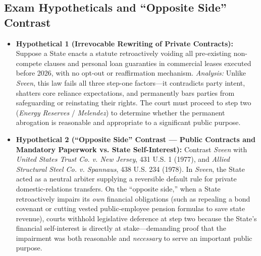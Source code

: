 \documentclass[12pt]{article}
\begin{document}
\subsection{Exam Hypotheticals and ``Opposite Side'' Contrast}
\begin{itemize}
  \item \textbf{Hypothetical 1 (Irrevocable Rewriting of Private Contracts):} Suppose a State enacts a statute retroactively voiding all pre-existing non-compete clauses and personal loan guaranties in commercial leases executed before 2026, with no opt-out or reaffirmation mechanism. \textit{Analysis:} Unlike \textit{Sveen}, this law fails all three step-one factors---it contradicts party intent, shatters core reliance expectations, and permanently bars parties from safeguarding or reinstating their rights. The court must proceed to step two (\textit{Energy Reserves} / \textit{Melendez}) to determine whether the permanent abrogation is reasonable and appropriate to a significant public purpose.
  \item \textbf{Hypothetical 2 (``Opposite Side'' Contrast --- Public Contracts and Mandatory Paperwork vs. State Self-Interest):} Contrast \textit{Sveen} with \textit{United States Trust Co. v. New Jersey}, 431 U.S. 1 (1977), and \textit{Allied Structural Steel Co. v. Spannaus}, 438 U.S. 234 (1978). In \textit{Sveen}, the State acted as a neutral arbiter supplying a reversible default rule for private domestic-relations transfers. On the ``opposite side,'' when a State retroactively impairs its \textit{own} financial obligations (such as repealing a bond covenant or cutting vested public-employee pension formulas to save state revenue), courts withhold legislative deference at step two because the State's financial self-interest is directly at stake---demanding proof that the impairment was both reasonable and \textit{necessary} to serve an important public purpose.
\end{itemize}
\end{document}
